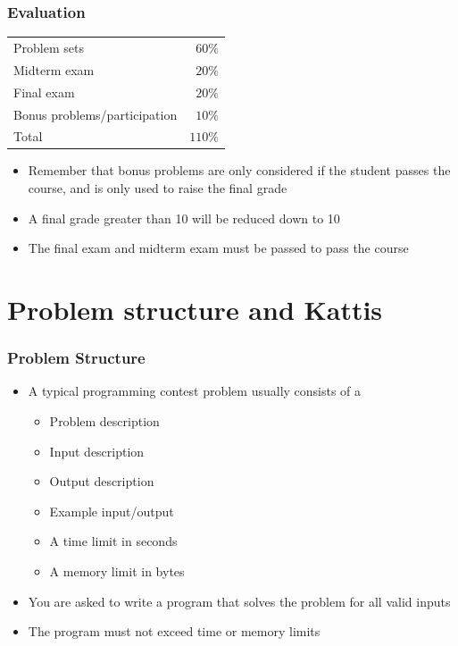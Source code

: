 \documentclass{beamer}
\begin{document}
\begin{frame}[plain]
	\frametitle{Evaluation}
	\begin{center}
        \begin{tabular}{lr}
            Problem sets & $60\%$ \\
            Midterm exam & $20\%$ \\
            Final exam & $20\%$ \\
            Bonus problems/participation & $10\%$ \\
            \hline
            Total & $110\%$ \\
        \end{tabular}
	\end{center}
	
	\begin{itemize}
        \item Remember that bonus problems are only considered if the student passes the course, and is only used to raise the final grade
        \item A final grade greater than 10 will be reduced down to 10
        \item The final exam and midterm exam must be passed to pass the course
	\end{itemize}
\end{frame}


\section*{Problem structure and Kattis}

\begin{frame}[plain]
	\frametitle{Problem Structure}
	\begin{itemize}
		\item A typical programming contest problem usually consists of a
        \begin{itemize} 
            \item Problem description
            \item Input description
            \item Output description
            \item Example input/output
            \item A time limit in seconds
            \item A memory limit in bytes
        \end{itemize}
        \item You are asked to write a program that solves the problem for all valid inputs
        \item The program must not exceed time or memory limits
	\end{itemize}
\end{frame}
\end{document}
